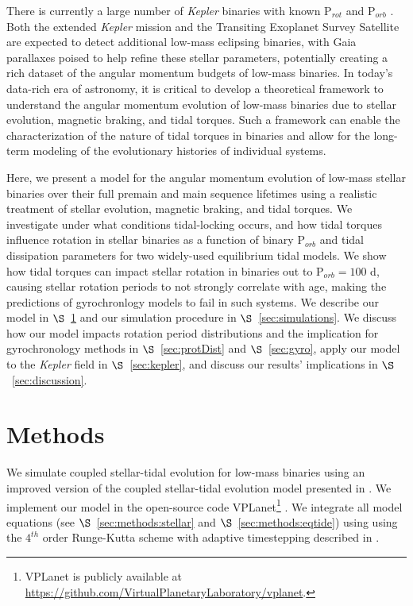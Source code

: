 \documentclass[twocolumn]{aastex61}
\newcommand{\kepler}[0]{\textit{Kepler}\xspace}
\begin{document}
There is currently a large number of \kepler binaries with known P$_{rot}$ and P$_{orb}$ \citep[e.g.][]{Lurie2017}. Both the extended \kepler mission \citep[K2,][]{Howell2014} and the Transiting Exoplanet Survey Satellite \citep[TESS, ][]{Ricker2014,Sullivan2015} are expected to detect additional low-mass eclipsing binaries, with Gaia parallaxes \citep{Gaia2016} poised to help refine these stellar parameters, potentially creating a rich dataset of the angular momentum budgets of low-mass binaries. In today's data-rich era of astronomy, it is critical to develop a theoretical framework to understand the angular momentum evolution of low-mass binaries due to stellar evolution, magnetic braking, and tidal torques.  Such a framework can enable the characterization of the nature of tidal torques in binaries and allow for the long-term modeling of the evolutionary histories of individual systems.

Here, we present a model for the angular momentum evolution of low-mass stellar binaries over their full premain and main sequence lifetimes using a realistic treatment of stellar evolution, magnetic braking, and tidal torques. We investigate under what conditions tidal-locking occurs, and how tidal torques influence rotation in stellar binaries as a function of binary P$_{orb}$ and tidal dissipation parameters for two widely-used equilibrium tidal models.  We show how tidal torques can impact stellar rotation in binaries out to P$_{orb} = 100$ d, causing stellar rotation periods to not strongly correlate with age, making the predictions of gyrochronlogy models to fail in such systems.  We describe our model in $\S$~\ref{sec:methods} and our simulation procedure in $\S$~\ref{sec:simulations}.  We discuss how our model impacts rotation period distributions and the implication for gyrochronology methods in $\S$~\ref{sec:protDist} and $\S$~\ref{sec:gyro}, apply our model to the \kepler field in $\S$~\ref{sec:kepler}, and discuss our results' implications in $\S$~\ref{sec:discussion}.


\section{Methods} \label{sec:methods}

We simulate coupled stellar-tidal evolution for low-mass binaries using an improved version of the coupled stellar-tidal evolution model presented in \citet{Fleming2018}.  We implement our model in the open-source code VPLanet\footnote{VPLanet is publicly available
at \href{https://github.com/VirtualPlanetaryLaboratory/vplanet}{{https://github.com/VirtualPlanetaryLaboratory/vplanet}}.} \citep[][Barnes et al., in prep]{Barnes2016,vplanet2018}.  We integrate all model equations (see $\S$~\ref{sec:methods:stellar} and $\S$~\ref{sec:methods:eqtide}) using using the $4^{th}$ order Runge-Kutta scheme with adaptive timestepping described in \citet{Fleming2018}.  
\end{document}
